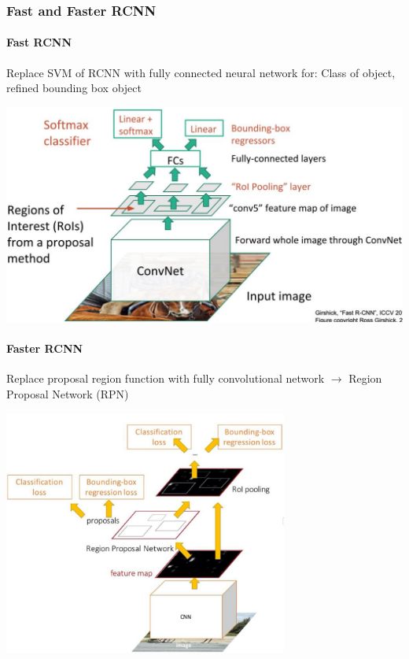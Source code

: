 \subsubsection{Fast and Faster RCNN}
\begin{minipage}{0.5\textwidth}
    \paragraph{Fast RCNN}
    Replace SVM of RCNN with fully connected neural network for: Class of object, refined bounding box object

    \includegraphics[width=1\textwidth]{sections/FindingMultipleObjects/img/fast_rcnn.png}
\end{minipage}
\begin{minipage}{0.5\textwidth}
    \paragraph{Faster RCNN}
    Replace proposal region function with fully convolutional network $\rightarrow$ Region Proposal Network (RPN)

    \includegraphics[width=0.7\textwidth]{sections/FindingMultipleObjects/img/faster_rcnn.png}
\end{minipage}

